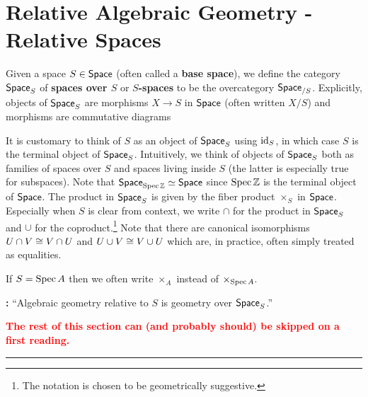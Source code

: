 \documentclass[11pt]{article}
\begin{document}
\section{Relative Algebraic Geometry - Relative Spaces}
Given a space $S\in\operatorname{\mathsf{Space}}$ (often called a \textbf{base space}), we define the category $\operatorname{\mathsf{Space}}_S$ of \textbf{spaces over $S$} or \textbf{$S$-spaces} to be the overcategory $\operatorname{\mathsf{Space}}_{/S}$. Explicitly, objects of $\operatorname{\mathsf{Space}}_S$ are morphisms $X\to S$ in $\operatorname{\mathsf{Space}}$ (often written $X/S$) and morphisms are commutative diagrams
\begin{center}
\end{center}
It is customary to think of $S$ as an object of $\operatorname{\mathsf{Space}}_S$ using $\operatorname{id}_S$, in which case $S$ is the terminal object of $\operatorname{\mathsf{Space}}_S$. Intuitively, we think of objects of $\operatorname{\mathsf{Space}}_S$ both as families of spaces over $S$ and spaces living inside $S$ (the latter is especially true for subspaces). Note that $\operatorname{\mathsf{Space}}_{\operatorname{Spec}\mathbb{Z}}\simeq\operatorname{\mathsf{Space}}$ since $\operatorname{Spec}\mathbb{Z}$ is the terminal object of $\operatorname{\mathsf{Space}}$. The product in $\operatorname{\mathsf{Space}}_S$ is given by the fiber product $\times_S$ in $\operatorname{\mathsf{Space}}$. Especially when $S$ is clear from context, we write $\cap$ for the product in $\operatorname{\mathsf{Space}}_S$ and $\cup$ for the coproduct.\footnote{The notation is chosen to be geometrically suggestive.} Note that there are canonical isomorphisms $U\cap V\cong V\cap U$ and $U\cup V\cong V\cup U$ which are, in practice, often simply treated as equalities.

\begin{remark}
If $S=\operatorname{Spec} A$ then we often write $\times_A$ instead of $\times_{\operatorname{Spec} A}$.
\end{remark}

\textbf{:} ``Algebraic geometry relative to $S$ is geometry over $\operatorname{\mathsf{Space}}_S$.''

\textbf{\textcolor{red}{The rest of this section can (and probably should) be skipped on a first reading.}}

\hrule
\end{document}
